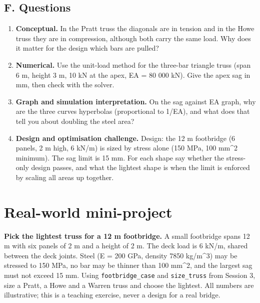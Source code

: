 \documentclass[11pt,a4paper]{article}
\begin{document}
\subsection*{F. Questions}
\begin{enumerate}[nosep]
\item \textbf{Conceptual.} In the Pratt truss the diagonals are in tension and in the Howe truss they are in compression, although both carry the same load. Why does it matter for the design which bars are pulled?
\item \textbf{Numerical.} Use the unit-load method for the three-bar triangle truss (span 6 m, height 3 m, 10 kN at the apex, EA = 80 000 kN). Give the apex sag in mm, then check with the solver.
\item \textbf{Graph and simulation interpretation.} On the sag against EA graph, why are the three curves hyperbolas (proportional to 1/EA), and what does that tell you about doubling the steel area?
\item \textbf{Design and optimisation challenge.} Design: the 12 m footbridge (6 panels, 2 m high, 6 kN/m) is sized by stress alone (150 MPa, 100 mm\textasciicircum{}2 minimum). The sag limit is 15 mm. For each shape say whether the stress-only design passes, and what the lightest shape is when the limit is enforced by scaling all areas up together.
\end{enumerate}

\section{Real-world mini-project}
\textbf{Pick the lightest truss for a 12 m footbridge.} A small footbridge spans 12 m with six panels of 2 m and a height of 2 m. The deck load is 6 kN/m, shared between the deck joints. Steel (E = 200 GPa, density 7850 kg/m\textasciicircum{}3) may be stressed to 150 MPa, no bar may be thinner than 100 mm\textasciicircum{}2, and the largest sag must not exceed 15 mm. Using \texttt{footbridge\_case} and \texttt{size\_truss} from Session 3, size a Pratt, a Howe and a Warren truss and choose the lightest. All numbers are illustrative; this is a teaching exercise, never a design for a real bridge.
\end{document}

